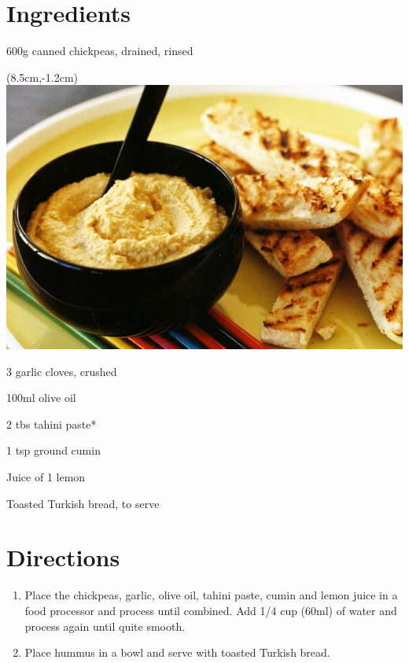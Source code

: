 \section*{Ingredients}
\begin{ingredients-list}
	\item 600g canned chickpeas, drained, rinsed
		\begin{textblock*}{8cm}(8.5cm,-1.2cm) %
			\includegraphics[scale=0.35]{./img/hummus.jpg}
		\end{textblock*}
	\item 3 garlic cloves, crushed
	\item 100ml olive oil
	\item 2 tbs tahini paste*
	\item 1 tsp ground cumin
	\item Juice of 1 lemon
	\item Toasted Turkish bread, to serve
\end{ingredients-list}

\section*{Directions}
\begin{enumerate}
	\item Place the chickpeas, garlic, olive oil, tahini paste, cumin and lemon juice in a food processor and process until combined.
		Add 1/4 cup (60ml) of water and process again until quite smooth.
	\item Place hummus in a bowl and serve with toasted Turkish bread.
\end{enumerate}

\label{tomato_kasundi}
\hypertarget{tomato_kasundi}{}%
